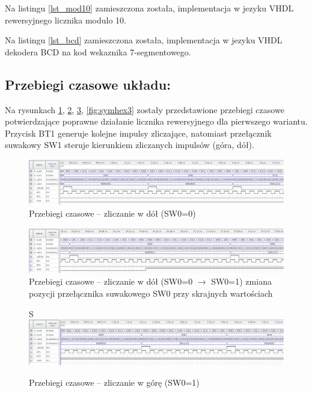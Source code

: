 \documentclass{classrep}
\begin{document}
Na listingu \ref{lst_mod10} zamieszczona została, implementacja w jezyku VHDL rewersyjnego licznika modulo 10. 



Na listingu \ref{lst_bcd} zamieszczona została, implementacja w jezyku VHDL dekodera BCD na kod wskaznika 7-segmentowego. 




\subsection{Przebiegi czasowe układu:}
Na rysunkach \ref{fig:symhex0}, \ref{fig:symhex1}, \ref{fig:symhex2}, \ref{fig:symhex3} zostały przedstawione przebiegi czasowe potwierdzające poprawne działanie
licznika rewersyjnego dla pierwszego wariantu. Przycisk BT1 generuje kolejne impulsy zliczające,
natomiast przełącznik suwakowy SW1 steruje kierunkiem zliczanych impulsów (góra, dół).


\begin{figure}[H]
	\centering
	\includegraphics[width=1.0\linewidth]{up_down_1.png}
	\caption{Przebiegi czasowe – zliczanie w dół (SW0=0)}
	\label{fig:symhex0}
\end{figure}



\begin{figure}[H]
	\centering
	\includegraphics[width=1.0\linewidth]{up_down_2.png}
	\caption{Przebiegi czasowe – zliczanie w dół (SW0=0 $\longrightarrow$ SW0=1) zmiana pozycji przełącznika suwakowego SW0 przy skrajnych wartościach	}
	\label{fig:symhex1}
\end{figure}



\begin{figure}[H]

S	\centering
	\includegraphics[width=1.0\linewidth]{up_down_inv_1.png}
	\caption{Przebiegi czasowe – zliczanie w górę (SW0=1) }
	\label{fig:symhex2}
\end{figure}
\end{document}
